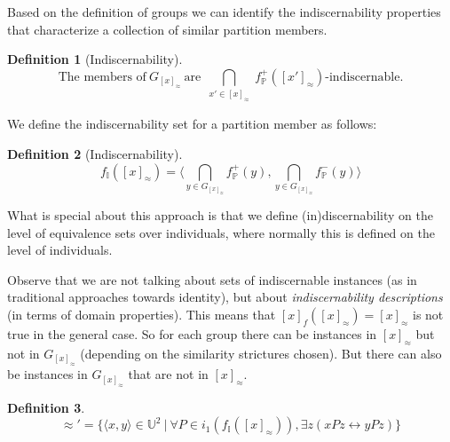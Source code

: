 \documentclass[11pt,a4paper,notitlepage,onecolumn,twoside]{article}
\newtheorem{definition}{Definition}
\begin{document}
Based on the definition of groups we can identify the indiscernability
properties that characterize a collection of similar partition members.

\begin{definition}[Indiscernability]
\begin{equation}
\text{The members of} \  G_{[x]_{\approx}} \  \text{are} \ 
  \underset{
    \substack{x' \in [x]_{\approx}}
  }{
    \operatorname{\bigcap}
  }
  f^{+}_{\mathbb{P}}([x']_{\approx})
  \text{-indiscernable}.
\end{equation}
\end{definition}

We define the indiscernability set for a partition member as follows:

\begin{definition}[Indiscernability]
\begin{equation}
f_{\mathbb{I}}([x]_{\approx}) =
  \langle
    \bigcap_{y \in G_{[x]_{\approx}}} f^{+}_{\mathbb{P}}(y),
    \bigcap_{y \in G_{[x]_{\approx}}} f^{-}_{\mathbb{P}}(y)
  \rangle
\end{equation}
\end{definition}

What is special about this approach is that we define (in)discernability on
the level of equivalence sets over individuals,
where normally this is defined on the level of individuals.

Observe that we are not talking about sets of indiscernable instances
(as in traditional approaches towards identity),
but about \emph{indiscernability descriptions}
(in terms of domain properties).
This means that $[x]_f([x]_{\approx}) = [x]_{\approx}$ is not true in the
general case. So for each group there can be instances in $[x]_{\approx}$
but not in $G_{[x]_{\approx}}$
(depending on the similarity strictures chosen).
But there can also be instances in $G_{[x]_{\approx}}$ that are not in
$[x]_{\approx}$.

\begin{definition}
\begin{equation}
\approx' = \{ \langle x, y \rangle \in \mathbb{U}^2 \  \vert \ 
    \forall P \in i_1(f_{\mathbb{I}}([x]_{\approx})), \exists z (xPz \leftrightarrow yPz) \}
\end{equation}
\end{definition}
\end{document}
